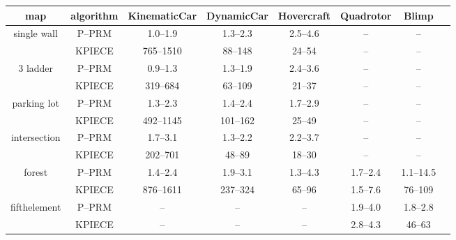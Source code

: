 \documentclass{article}
\begin{document}
\begin{tabular}{c c | c c c c c c}
map&algorithm&KinematicCar&DynamicCar&Hovercraft&Quadrotor&Blimp\\\hline
\multirow{2}{*}{single wall}&P--PRM&1.0--1.9&1.3--2.3&2.5--4.6&--&--\\
&KPIECE&765--1510&88--148&24--54&--&--\\
\multirow{2}{*}{3 ladder}&P--PRM&0.9--1.3&1.3--1.9&2.4--3.6&--&--\\
&KPIECE&319--684&63--109&21--37&--&--\\
\multirow{2}{*}{parking lot}&P--PRM&1.3--2.3&1.4--2.4&1.7--2.9&--&--\\
&KPIECE&492--1145&101--162&25--49&--&--\\
\multirow{2}{*}{intersection}&P--PRM&1.7--3.1&1.3--2.2&2.2--3.7&--&--\\
&KPIECE&202--701&48--89&18--30&--&--\\
\multirow{2}{*}{forest}&P--PRM&1.4--2.4&1.9--3.1&1.3--4.3&1.7--2.4&1.1--14.5\\
&KPIECE&876--1611&237--324&65--96&1.5--7.6&76--109\\
\multirow{2}{*}{fifthelement}&P--PRM&--&--&--&1.9--4.0&1.8--2.8\\
&KPIECE&--&--&--&2.8--4.3&46--63\\
\end{tabular}
\end{document}
